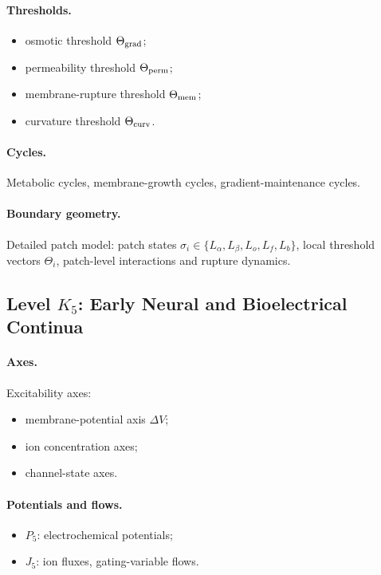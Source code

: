 \paragraph{Thresholds.}
\begin{itemize}
    \item osmotic threshold \(\Theta_{\rm grad}\);
    \item permeability threshold \(\Theta_{\rm perm}\);
    \item membrane-rupture threshold \(\Theta_{\rm mem}\);
    \item curvature threshold \(\Theta_{\rm curv}\).
\end{itemize}

\paragraph{Cycles.}
Metabolic cycles, membrane-growth cycles, gradient-maintenance cycles.

\paragraph{Boundary geometry.}
Detailed patch model:  
patch states \(\sigma_i\in\{L_\alpha,L_\beta,L_o,L_f,L_b\}\),
local threshold vectors \(\Theta_i\),
patch-level interactions and rupture dynamics.


\subsection{Level \texorpdfstring{\texorpdfstring{$K_5$}{K\_5}}{K5}: Early Neural and Bioelectrical Continua}

\paragraph{Axes.}
Excitability axes:
\begin{itemize}
    \item membrane-potential axis \(\Delta V\);
    \item ion concentration axes;
    \item channel-state axes.
\end{itemize}

\paragraph{Potentials and flows.}
\begin{itemize}
    \item \(P_5\): electrochemical potentials;
    \item \(J_5\): ion fluxes, gating-variable flows.
\end{itemize}

